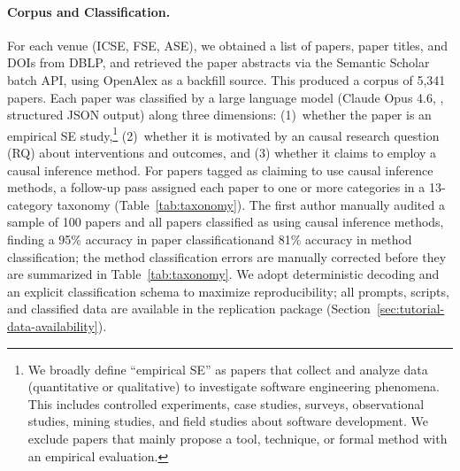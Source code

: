 \paragraph{Corpus and Classification.}
For each venue (ICSE, FSE, ASE), we obtained a list of papers, paper titles, and DOIs from DBLP, and retrieved the paper abstracts via the Semantic Scholar batch API, using OpenAlex as a backfill source.
This produced a corpus of 5,341 papers.
Each paper was classified by a large language model (Claude Opus 4.6, , structured JSON output) along three dimensions: (1)~whether the paper is an empirical SE study,\footnote{
  We broadly define ``empirical SE'' as papers that collect and analyze data (quantitative or qualitative) to investigate software engineering phenomena.
  This includes controlled experiments, case studies,
  surveys, observational studies, mining studies, and field studies about
  software development.
  We exclude papers that mainly propose a tool, technique, or formal method with an empirical evaluation.
}  %
(2)~whether it is motivated by an causal research question (RQ) about interventions and outcomes, and (3) whether it claims to employ a causal inference method.
For papers tagged as claiming to use causal inference methods, a follow-up pass assigned each paper to one or more categories in a 13-category taxonomy (Table~\ref{tab:taxonomy}).
The first author manually audited a sample of 100 papers and all papers classified as using causal inference methods, finding a 95\% accuracy in paper classificationand 81\% accuracy in method classification; the method classification errors are manually corrected before they are summarized in Table~\ref{tab:taxonomy}.
We adopt deterministic decoding and an explicit classification schema to maximize reproducibility; all prompts, scripts, and classified data are available in the replication package (Section~\ref{sec:tutorial-data-availability}).


